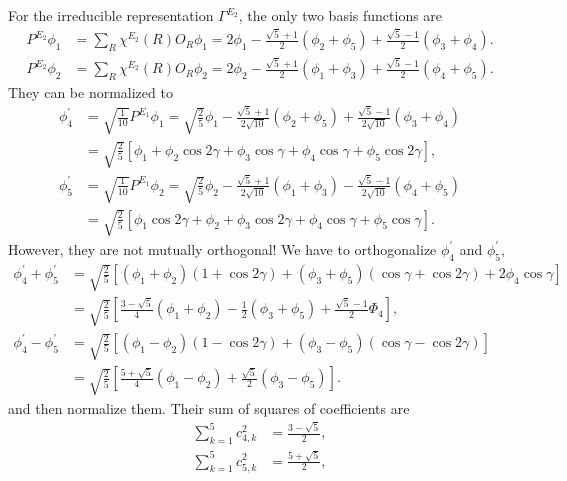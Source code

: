 		For the irreducible representation $\Gamma^{E_2}$, the only two basis functions are
		\begin{align*}
			P^{E_2}\phi_1 &= \sum_{R} \chi^{E_2}(R) O_R \phi_1 = 2\phi_1 - \frac{\sqrt{5}+1}{2}(\phi_2 + \phi_5) + \frac{\sqrt{5}-1}{2}(\phi_3 + \phi_4). \\
			P^{E_2}\phi_2 &= \sum_{R} \chi^{E_2}(R) O_R \phi_2 = 2\phi_2 - \frac{\sqrt{5}+1}{2}(\phi_1 + \phi_3) + \frac{\sqrt{5}-1}{2}(\phi_4 + \phi_5).
		\end{align*}
		They can be normalized to
		\begin{align*}
			\phi^\prime_4 &= \sqrt{\frac{1}{10}} P^{E_1}\phi_1 = \sqrt{ \frac{2}{5} }\phi_1 - \frac{\sqrt{5}+1}{2\sqrt{10}}(\phi_2+\phi_5) + \frac{\sqrt{5}-1}{2\sqrt{10}}(\phi_3+\phi_4) \\
			&= \sqrt{ \frac{2}{5} } \left[ \phi_1 + \phi_2 \cos2\gamma + \phi_3\cos\gamma + \phi_4\cos\gamma + \phi_5\cos2\gamma \right], \\
			\phi^\prime_5 &= \sqrt{\frac{1}{10}} P^{E_1}\phi_2 = \sqrt{ \frac{2}{5} }\phi_2 - \frac{\sqrt{5}+1}{2\sqrt{10}}(\phi_1+\phi_3) - \frac{\sqrt{5}-1}{2\sqrt{10}}(\phi_4+\phi_5) \\
			&= \sqrt{ \frac{2}{5} } \left[ \phi_1\cos2\gamma + \phi_2  + \phi_3\cos2\gamma + \phi_4\cos\gamma + \phi_5\cos\gamma \right].
		\end{align*}
		However, they are not mutually orthogonal! We have to orthogonalize $\phi^\prime_4$ and $\phi^\prime_5$,
		\begin{align*}
			\phi^\prime_4 + \phi^\prime_5 &= \sqrt{ \frac{2}{5} } \left[ (\phi_1+\phi_2) (1+\cos2\gamma) + (\phi_3+\phi_5) (\cos\gamma + \cos 2\gamma) + 2\phi_4\cos\gamma \right] \\
			&= \sqrt{ \frac{2}{5} } \left[ \frac{3-\sqrt{5}}{4}(\phi_1 + \phi_2) - \frac{1}{2} (\phi_3 + \phi_5) + \frac{ \sqrt{5}-1 }{2} \Phi_4 \right] , \\
			\phi^\prime_4 - \phi^\prime_5 &= \sqrt{ \frac{2}{5} } \left[ (\phi_1-\phi_2) (1-\cos2\gamma) + (\phi_3-\phi_5) (\cos\gamma - \cos2\gamma) \right] \\
			&=\sqrt{ \frac{2}{5} } \left[ \frac{ 5+\sqrt{5} }{4} (\phi_1 - \phi_2) + \frac{ \sqrt{5} }{2} (\phi_3 - \phi_5) \right].
		\end{align*}
		and then normalize them. Their sum of squares of coefficients are
		\begin{align*}
			\sum_{k=1}^5 c^2_{4,k} &= \frac{3-\sqrt{5}}{2}, \\
			\sum_{k=1}^5 c^2_{5,k} &= \frac{5+\sqrt{5}}{2},
		\end{align*}
